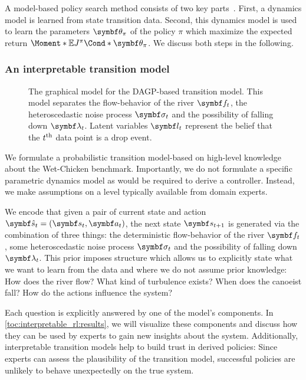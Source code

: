 A model-based policy search method consists of two key parts~\parencite{deisenroth_pilco_2011}.
First, a dynamics model is learned from state transition data.
Second, this dynamics model is used to learn the parameters $\mat{\theta}_\pi$ of the policy $\pi$ which maximize the expected return $\Moment*{\E}{\Fun*{J^\pi}{\mat{\theta}_\pi}}$.
We discuss both steps in the following.


\subsubsection{An interpretable transition model}
\label{toc:interpretable_rl:mdgp}
\begin{figure}[t]
    \centering
    
    \caption[Graphical model: Wet-chicken dynamics model]{
        \label{fig:interpretable_rl:graphical_model:mdgp}
        The graphical model for the DAGP-based transition model.
        This model separates the flow-behavior of the river $\mat{f}_t$, the heteroscedastic noise process $\mat{\sigma}_t$ and the possibility of falling down $\mat{\lambda}_t$.
        Latent variables $\mat{l}_t$ represent the belief that the $t^{\text{th}}$ data point is a drop event.
    }
\end{figure}
We formulate a probabilistic transition model-based on high-level knowledge about the Wet-Chicken benchmark.
Importantly, we do not formulate a specific parametric dynamics model as would be required to derive a controller.
Instead, we make assumptions on a level typically available from domain experts.

We encode that given a pair of current state and action $\mat{\hat{s}}_t = \left( \mat{s}_t, \mat{a}_t \right)$, the next state $\mat{s}_{t+1}$ is generated via the combination of three things:
the deterministic flow-behavior of the river $\mat{f}_t$, some heteroscedastic noise process $\mat{\sigma}_t$ and the possibility of falling down $\mat{\lambda}_t$.
This prior imposes structure which allows us to explicitly state what we want to learn from the data and where we do not assume prior knowledge:
How does the river flow?
What kind of turbulence exists?
When does the canoeist fall?
How do the actions influence the system?

Each question is explicitly answered by one of the model's components.
In \cref{toc:interpretable_rl:results}, we will visualize these components and discuss how they can be used by experts to gain new insights about the system.
Additionally, interpretable transition models help to build trust in derived policies:
Since experts can assess the plausibility of the transition model, successful policies are unlikely to behave unexpectedly on the true system.

